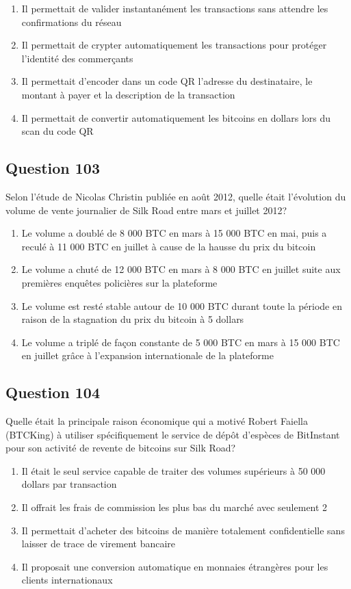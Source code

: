 \documentclass[12pt,a4paper]{article}
\begin{document}
\begin{enumerate}[label=\Alph*., leftmargin=*]
\item Il permettait de valider instantanément les transactions sans attendre les confirmations du réseau
\item Il permettait de crypter automatiquement les transactions pour protéger l'identité des commerçants
\item Il permettait d'encoder dans un code QR l'adresse du destinataire, le montant à payer et la description de la transaction
\item Il permettait de convertir automatiquement les bitcoins en dollars lors du scan du code QR
\end{enumerate}

\bigskip


\subsection*{Question 103}
Selon l'étude de Nicolas Christin publiée en août 2012, quelle était l'évolution du volume de vente journalier de Silk Road entre mars et juillet 2012?

\begin{enumerate}[label=\Alph*., leftmargin=*]
\item Le volume a doublé de 8 000 BTC en mars à 15 000 BTC en mai, puis a reculé à 11 000 BTC en juillet à cause de la hausse du prix du bitcoin
\item Le volume a chuté de 12 000 BTC en mars à 8 000 BTC en juillet suite aux premières enquêtes policières sur la plateforme
\item Le volume est resté stable autour de 10 000 BTC durant toute la période en raison de la stagnation du prix du bitcoin à 5 dollars
\item Le volume a triplé de façon constante de 5 000 BTC en mars à 15 000 BTC en juillet grâce à l'expansion internationale de la plateforme
\end{enumerate}

\bigskip


\subsection*{Question 104}
Quelle était la principale raison économique qui a motivé Robert Faiella (BTCKing) à utiliser spécifiquement le service de dépôt d'espèces de BitInstant pour son activité de revente de bitcoins sur Silk Road?

\begin{enumerate}[label=\Alph*., leftmargin=*]
\item Il était le seul service capable de traiter des volumes supérieurs à 50 000 dollars par transaction
\item Il offrait les frais de commission les plus bas du marché avec seulement 2%
\item Il permettait d'acheter des bitcoins de manière totalement confidentielle sans laisser de trace de virement bancaire
\item Il proposait une conversion automatique en monnaies étrangères pour les clients internationaux
\end{enumerate}
\end{document}
